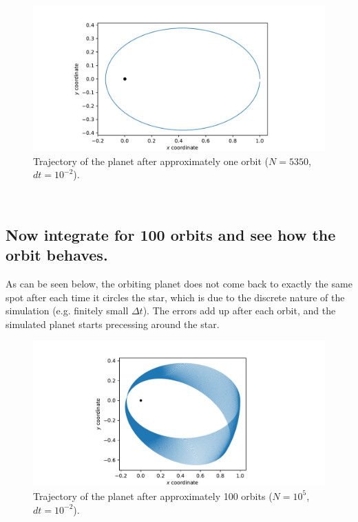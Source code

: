     \begin{figure}[h!]
        \centering
        \includegraphics[width=\textwidth]{./figures/task1_1_orbit_lf.pdf}
        \caption{Trajectory of the planet after approximately one orbit
            ($N=5350$, $dt=10^{-2}$).
        }
    \end{figure} \ \\ 

\newpage
\subsection{Now integrate for 100 orbits and see how the orbit behaves.}
    As can be seen below, the orbiting planet does not come back to exactly the 
    same spot after each time it circles the star, which is due to the discrete
    nature of the simulation (e.g. finitely small $\Delta t$). The errors add 
    up after each orbit, and the simulated planet starts precessing around the 
    star.
    \begin{figure}[h!]
        \centering
        \includegraphics[width=\textwidth]{./figures/task1_1_orbit_lf_100.pdf}
        \caption{Trajectory of the planet after approximately 100 orbits
            ($N=10^5$, $dt=10^{-2}$).
        }
    \end{figure}

